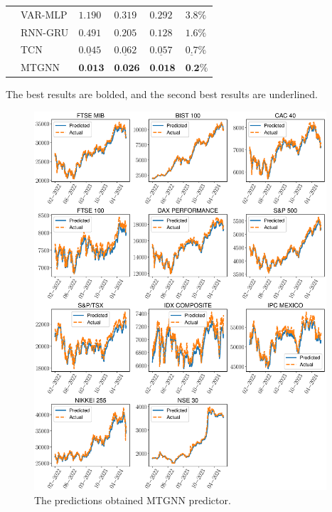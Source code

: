 \begin{table}[bt]
{\begin{tabular}{ *6l }
    & VAR-MLP & $1.190$ & $0.319$ & $0.292$ & $3.8\%$ \\
    & RNN-GRU & $0.491$ & $0.205$ & $0.128$ & $1.6\%$\\
    & TCN & $\underline{0.045}$ & $\underline{0.062}$ & $\underline{0.057}$ & $\underline{0.7}\%$\\
    & MTGNN & $\textbf{0.013}$ & $\textbf{0.026}$ & $\textbf{0.018}$ & $\textbf{0.2}\%$ \\
    \bottomrule
    \hline
    \end{tabular}
    }
    \begin{tablenotes}
      \small
      \centering
      \item The best results are bolded, and the second best results are underlined.
    \end{tablenotes}
\end{table}


\begin{figure}[tbh]
  \centering
  \includegraphics[width=0.97\textwidth]{./figures/predictions.eps}
  \caption{The predictions obtained MTGNN predictor.} 
  \label{fig:predictions}
\end{figure}